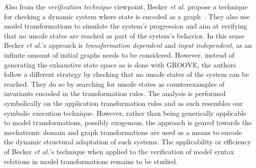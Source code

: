 Also from the \emph{verification technique} viewpoint, Becker \emph{et al.} propose a technique for checking a dynamic system where state is encoded as a graph~\cite{Becker:2006:SIV:1134285.1134297}. They also use model transformations to simulate the system's progression and aim at verifying that no unsafe states are reached as part of the system's behavior. In this sense Becker \emph{et al.}'s approach is \emph{transformation dependent} and \emph{input independent}, as an infinite amount of initial graphs needs to be considered. However, instead of generating the exhaustive state space as is done with GROOVE, the authors follow a different strategy by checking that no unsafe states of the system can be reached. They do so by searching for unsafe states as counterexamples of invariants encoded in the transformation rules. The analysis is performed symbolically on the application transformation rules and as such resembles our symbolic execution technique.
However, rather than being generically applicable to model transformations, possibly exogenous, the approach is geared towards the mechatronic domain and graph transformations are used as a means to encode the dynamic structural adaptation of such systems.
The applicability or efficiency of Becker \emph{et al.}'s technique when applied to the verification of model syntax relations in model transformations remains to be studied.